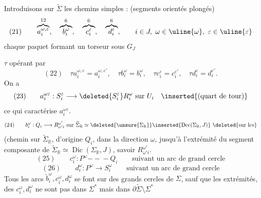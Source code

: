 Introduisons sur $\widetilde\Sigma$ les  chemins simples : (segments orientés plongés)
\[
(21)\qquad\overbrace{a_i^{\omega,\varepsilon}}^{12},\quad
\overbrace{b_i^\omega}^{6},\quad\overbrace{c_i^\varepsilon}^{6},\quad\overbrace{d_i^\varepsilon}^{6},\qquad
i\in J,\ \omega\in\uline{\omega},\ \varepsilon\in\uline{\varepsilon}
\]
chaque paquet  formant un torseur sous $G_J$

$\tau$ opérant par
\[
(22)\quad \tau a_i^{\omega,\varepsilon}=a_i^{\omega,\varepsilon'},\quad
\tau b_i^\omega=b_i^\omega,\quad \tau c_i^\varepsilon=c_i^{\varepsilon'},\quad \tau d_i^\varepsilon=d_i^{\varepsilon'}.
\]
On a
\[
(23)\qquad a_i^{\omega\varepsilon}:S_i^\varepsilon\longrightarrow\deleted{S_i^\varepsilon}R_i^\omega\text{ sur }U_i\quad\inserted{(\text{quart de tour})}
\]
ce qui caractérise $a_i^{\omega\varepsilon}$. 
\[
(24)\qquad b_i^\omega:Q_i\longrightarrow R_{\omega'i}^{\omega'}\text{ sur }\widetilde\Sigma_{\mathbb R}\simeq\deleted{\unsure{\Sigma_{\mathbb R}}}\inserted{\operatorname{Dec}(\Sigma_{\mathbb R},J)}\ \deleted{\text{sur les}}
\]
(chemin sur $\widetilde\Sigma_{\mathbb R}$, d'origine $Q_i$, dans la direction $\omega$, jusqu'à l'extrémité  du segment composante de $\widetilde\Sigma_{\mathbb R}\simeq\operatorname{Dic}(\Sigma_{\mathbb R},J)$, savoir $R_{\omega'i}^{\omega'}$.
\[
(25)\qquad c_i^\omega:P^\omega\mathrel{-\!\!\!-\!\!\!-}Q_i\qquad\text{suivant un arc de grand cercle}
\]
\[
(26)\qquad d_i^\omega:P^\omega\longrightarrow S_i^\omega\qquad\text{suivant un arc de grand cercle}
\]
Tous les arcs $\widetilde b_i^\omega,c_i^\omega,d_i^\omega$ se font sur des grands cercles de $\Sigma$, sauf que les extrémités, des $c_i^\omega,d_i^\omega$ ne sont pas dans $\Sigma^*$ mais dans  $\partial\widetilde\Sigma\setminus\Sigma^*$

